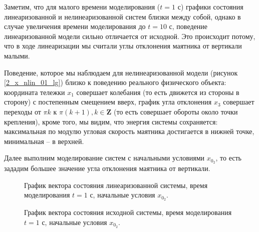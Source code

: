 Заметим, что для малого времени моделирования ($t=1$ с) графики состояния линеаризованной и нелинеаризованной систем близки между собой, однако в случае увеличения времени моделирования до $t=10$ с, поведение линеаризованной модели сильно отличается от исходной. Это происходит потому, что в ходе линеаризации мы считали углы отклонения маятника от вертикали малыми. 

Поведение, которое мы наблюдаем для нелинеаризованной модели (рисунок \ref{2_x_nlin_01_lg}) близко к поведению реального физического объекта: координата тележки $x_1$ совершает колебания (то есть движется из стороны в сторону) с постепенным смещением вверх, график угла отклонения $x_3$ совершает переходы от $\pi k$ к $\pi(k+1), k \in \mathbf{Z}$ (то есть совершает обороты около точки крепления), кроме того, мы видим, что энергия системы сохраняется: максимальная по модулю угловая скорость маятника достигается в нижней точке, минимальная -- в верхней.


Далее выполним моделирование систем с начальными условиями $x_{0_2}$, то есть зададим  большее значение угла отклонения маятника от вертикали.
\begin{figure}[!h]
\caption{График вектора состояния линеаризованной системы, время моделирования $t=1$ с, начальные условия $x_{0_2}$.}
\label{2_x_lin_02_sm}
\end{figure}

\begin{figure}[!h]
\caption{График вектора состояния исходной системы, время моделирования $t=1$ с, начальные условия $x_{0_2}$.}
\label{2_x_nlin_02_sm}
\end{figure}

